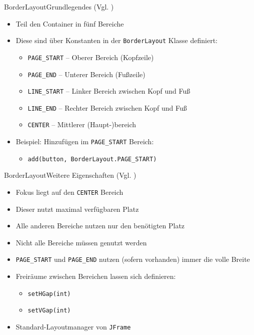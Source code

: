 \begin{frame}{BorderLayout}{Grundlegendes (Vgl. \cite{orac:borderlayout})}
    \begin{itemize}
        \item Teil den Container in fünf Bereiche
        \item Diese sind über Konstanten in der \texttt{BorderLayout} Klasse definiert:
        \begin{itemize}
            \item \texttt{PAGE_START} -- Oberer Bereich (Kopfzeile)
            \item \texttt{PAGE_END} -- Unterer Bereich (Fußzeile)
            \item \texttt{LINE_START} -- Linker Bereich zwischen Kopf und Fuß
            \item \texttt{LINE_END} -- Rechter Bereich zwischen Kopf und Fuß
            \item \texttt{CENTER} -- Mittlerer (Haupt-)bereich
        \end{itemize}
        \item Beispiel: Hinzufügen im \texttt{PAGE_START} Bereich:
        \begin{itemize}
            \item \texttt{add(button, BorderLayout.PAGE_START)}
        \end{itemize}        
    \end{itemize}
\end{frame}

\begin{frame}{BorderLayout}{Weitere Eigenschaften (Vgl. \cite{orac:borderlayout})}
    \begin{itemize}
        \item Fokus liegt auf den \texttt{CENTER} Bereich
        \item Dieser nutzt maximal verfügbaren Platz
        \item Alle anderen Bereiche nutzen nur den benötigten Platz
        \item Nicht alle Bereiche müssen genutzt werden
        \item \texttt{PAGE_START} und \texttt{PAGE_END} nutzen (sofern vorhanden) immer die volle Breite
        \item Freiräume zwischen Bereichen lassen sich definieren:
        \begin{itemize}
            \item \texttt{setHGap(int)}
            \item \texttt{setVGap(int)}
        \end{itemize}
        \item Standard-Layoutmanager von \texttt{JFrame}
    \end{itemize}
\end{frame}

